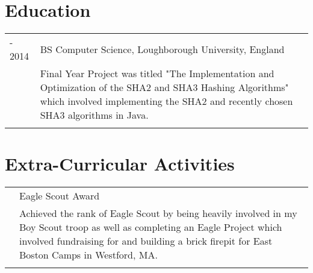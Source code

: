 \documentclass[12pt]{article}
\begin{document}
\section*{\selectfont Education}
\begin{tabular}{p{2.3cm}|p{15.4cm}}
	\centering 2011 - 2014 & BS Computer Science, Loughborough University, England\\&\small{Final Year Project was titled "The Implementation and Optimization of the SHA2 and SHA3 Hashing Algorithms" which involved implementing the SHA2 and recently chosen SHA3 algorithms in Java.}\\\multicolumn{2}{c}{} \\
\end{tabular}

\section*{\selectfont Extra-Curricular Activities}
\begin{tabular}{p{2.3cm}|p{15.4cm}}
	& Eagle Scout Award\\&\small{Achieved the rank of Eagle Scout by being heavily involved in my Boy Scout troop as well as completing an Eagle Project which involved fundraising for and building a brick firepit for East Boston Camps in Westford, MA.}\\\multicolumn{2}{c}{} \\
\end{tabular}
\end{document}
